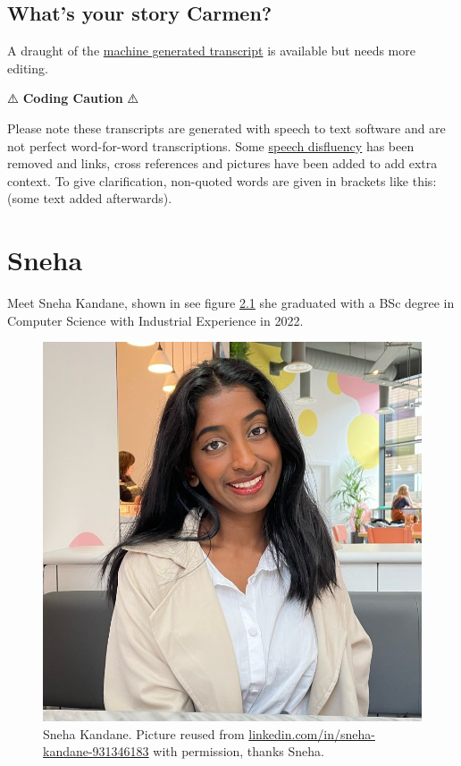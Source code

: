\documentclass[
]{book}
\begin{document}
\hypertarget{carmen-story}{%
\section{What's your story Carmen?}\label{carmen-story}}

A draught of the \href{https://github.com/dullhunk/cdyf/blob/master/25-carmen.md}{machine generated transcript} is available but needs more editing.

⚠️ \textbf{Coding Caution} ⚠️

Please note these transcripts are generated with speech to text software and are not perfect word-for-word transcriptions. Some \href{https://en.wikipedia.org/wiki/Speech_disfluency}{speech disfluency} has been removed and links, cross references and pictures have been added to add extra context. To give clarification, non-quoted words are given in brackets like this: (some text added afterwards).

\hypertarget{sneha}{%
\chapter{Sneha}\label{sneha}}

Meet Sneha Kandane, shown in see figure \ref{fig:sneha-fig} she graduated with a BSc degree in Computer Science with Industrial Experience in 2022.

\begin{figure}

{\centering \includegraphics[width=1\linewidth]{images/sneha} 

}

\caption{Sneha Kandane. Picture reused from \href{https://www.linkedin.com/in/sneha-kandane-931346183/}{linkedin.com/in/sneha-kandane-931346183} with permission, thanks Sneha.}\label{fig:sneha-fig}
\end{figure}
\end{document}
